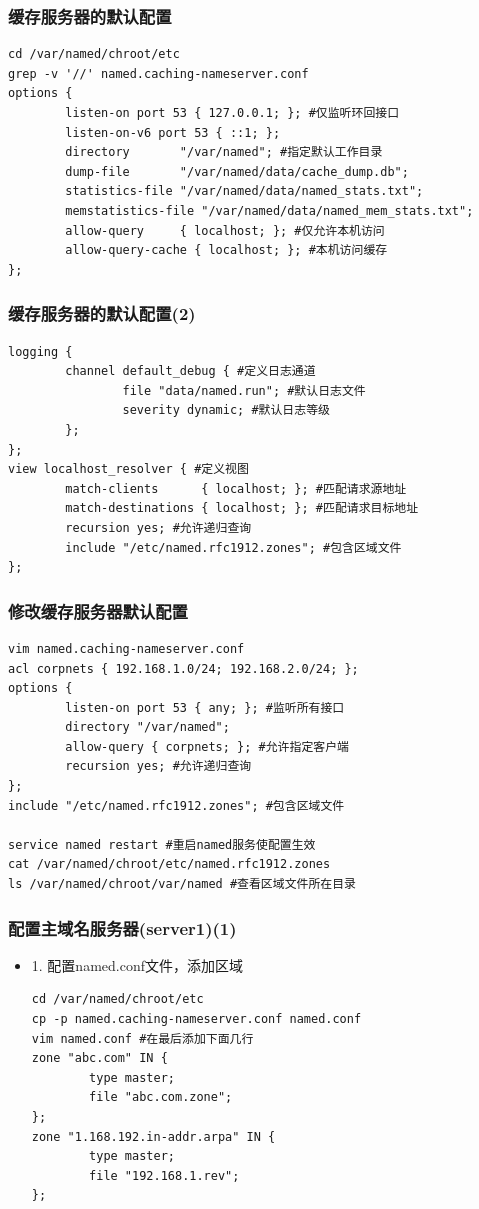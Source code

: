 \documentclass[xcolor=svgnames,presentation]{beamer}
\begin{document}
\begin{frame}[fragile]
\frametitle{缓存服务器的默认配置}
\label{sec-1-4}


\begin{verbatim}
cd /var/named/chroot/etc
grep -v '//' named.caching-nameserver.conf
options {
        listen-on port 53 { 127.0.0.1; }; #仅监听环回接口
        listen-on-v6 port 53 { ::1; };
        directory       "/var/named"; #指定默认工作目录
        dump-file       "/var/named/data/cache_dump.db";
        statistics-file "/var/named/data/named_stats.txt";
        memstatistics-file "/var/named/data/named_mem_stats.txt";
        allow-query     { localhost; }; #仅允许本机访问
        allow-query-cache { localhost; }; #本机访问缓存
};
\end{verbatim}
\end{frame}
\begin{frame}[fragile]
\frametitle{缓存服务器的默认配置(2)}
\label{sec-1-5}


\begin{verbatim}
logging {
        channel default_debug { #定义日志通道
                file "data/named.run"; #默认日志文件
                severity dynamic; #默认日志等级
        };
};
view localhost_resolver { #定义视图
        match-clients      { localhost; }; #匹配请求源地址
        match-destinations { localhost; }; #匹配请求目标地址
        recursion yes; #允许递归查询
        include "/etc/named.rfc1912.zones"; #包含区域文件
};
\end{verbatim}
\end{frame}
\begin{frame}[fragile]
\frametitle{修改缓存服务器默认配置}
\label{sec-1-6}


\begin{verbatim}
vim named.caching-nameserver.conf
acl corpnets { 192.168.1.0/24; 192.168.2.0/24; };
options {
        listen-on port 53 { any; }; #监听所有接口
        directory "/var/named";
        allow-query { corpnets; }; #允许指定客户端
        recursion yes; #允许递归查询
};
include "/etc/named.rfc1912.zones"; #包含区域文件

service named restart #重启named服务使配置生效
cat /var/named/chroot/etc/named.rfc1912.zones
ls /var/named/chroot/var/named #查看区域文件所在目录
\end{verbatim}
\end{frame}
\begin{frame}[fragile]
\frametitle{配置主域名服务器(server1)(1)}
\label{sec-1-7}
\begin{itemize}

\item 1. 配置named.conf文件，添加区域\\
\label{sec-1-7-1}%
\begin{verbatim}
cd /var/named/chroot/etc
cp -p named.caching-nameserver.conf named.conf
vim named.conf #在最后添加下面几行
zone "abc.com" IN {
        type master;
        file "abc.com.zone";
};
zone "1.168.192.in-addr.arpa" IN {
        type master;
        file "192.168.1.rev";
};
\end{verbatim}
\end{itemize} %
\end{frame}
\end{document}
